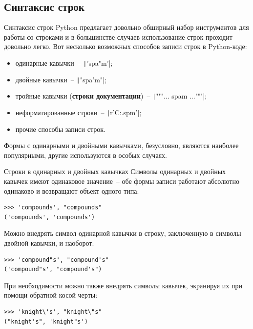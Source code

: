 \documentclass[aspectratio=169, mathserif]{beamer}%
\begin{document}
\subsection{Синтаксис строк}
\begin{frame}[fragile]{Синтаксис строк}
\scriptsize
Python предлагает довольно обширный набор инструментов для работы со строками и в большинстве случаев использование строк проходит довольно легко. Вот несколько возможных способов записи строк в Python-коде:

\begin{itemize}
\item одинарные кавычки~--  \texttt|'spa"m'|;
\item двойные кавычки~-- \texttt|"spa'm"|;
\item тройные кавычки (\textcolor{extraorange}{\textbf{строки документации}})~-- \texttt|"""... spam ..."""|;
\item неформатированные строки~-- \texttt|r'C:\new\test.spm'|;
\item прочие способы записи строк.
\end{itemize}

Формы с одинарными и двойными кавычками, безусловно, являются наиболее популярными, другие используются в особых случаях.
\vfill
\end{frame}


\begin{frame}[fragile]{Строки в одинарных и двойных кавычках}
\scriptsize
Символы одинарных и двойных кавычек имеют одинаковое значение~-- обе формы записи работают абсолютно одинаково и возвращают объект одного типа:
\begin{verbatim}
>>> 'compounds', "compounds"
('compounds', 'compounds')
\end{verbatim}

Можно внедрять символ одинарной кавычки в строку, заключенную в символы двойной кавычки, и наоборот:
\begin{verbatim}
>>> 'compound"s', "compound's"
('compound"s', "compound's")
\end{verbatim}

При необходимости можно также внедрять символы кавычек, экранируя их при помощи обратной косой черты:
\begin{verbatim}
>>> 'knight\'s', "knight\"s"
("knight's", 'knight"s')
\end{verbatim}
\vfill
\end{frame}
\end{document}

